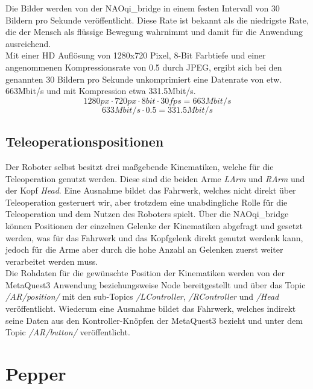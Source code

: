 Die Bilder werden von der NAOqi\_bridge in einem festen Intervall von 30 Bildern pro Sekunde veröffentlicht. Diese Rate ist bekannt als die niedrigste Rate, die der Mensch als flüssige Bewegung wahrnimmt und damit für die Anwendung ausreichend.\\
Mit einer \ac{HD} Auflösung von 1280x720 Pixel, 8-Bit Farbtiefe und einer angenommenen Kompressionsrate von 0.5 durch \ac{JPEG}, ergibt sich bei den genannten 30 Bildern pro Sekunde unkomprimiert eine Datenrate von etw. 663Mbit/s und mit Kompression etwa 331.5Mbit/s.\\
\begin{equation}
    1280px \cdot 720px \cdot 8bit \cdot 30fps = 663Mbit/s
    \label{eq:datenrate}
\end{equation}
\begin{equation}
    633Mbit/s \cdot 0.5 = 331.5Mbit/s
    \label{eq:datenrate-komprimiert}
\end{equation}

\subsection{Teleoperationspositionen}
Der Roboter selbst besitzt drei maßgebende Kinematiken, welche für die Teleoperation genutzt werden. Diese sind die beiden Arme  \textit{LArm} und \textit{RArm} und der Kopf \textit{Head}. Eine Ausnahme bildet das Fahrwerk, welches nicht direkt über Teleoperation gesteruert wir, aber trotzdem eine unabdingliche Rolle für die Teleoperation und dem Nutzen des Roboters spielt. Über die NAOqi\_bridge können Positionen der einzelnen Gelenke der Kinematiken abgefragt und gesetzt werden, was für das Fahrwerk und das Kopfgelenk direkt genutzt werdenk kann, jedoch für die Arme aber durch die hohe Anzahl an Gelenken zuerst weiter verarbeitet werden muss.\\
Die Rohdaten für die gewünschte Position der Kinematiken werden von der MetaQuest3 Anwendung beziehungsweise Node bereitgestellt und über das Topic \textit{/AR/position/} mit den sub-Topics \textit{/LController}, \textit{/RController} und \textit{/Head} veröffentlicht. Wiederum eine Ausnahme bildet das Fahrwerk, welches indirekt seine Daten aus den Kontroller-Knöpfen der MetaQuest3 bezieht und unter dem Topic \textit{/AR/button/} veröffentlicht.\\




\section{Pepper}
